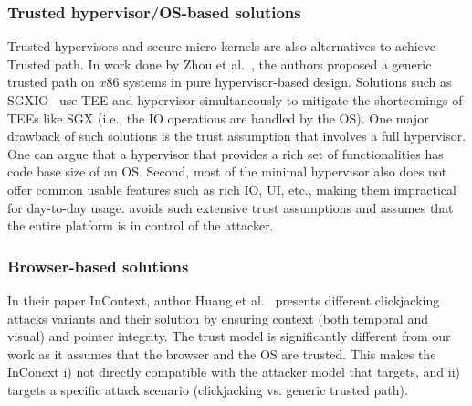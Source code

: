 \subsubsection{Trusted hypervisor/OS-based solutions} Trusted hypervisors and secure micro-kernels are also alternatives to achieve Trusted path. In work done by Zhou et al.~\cite{zhou2012building}, the authors proposed a generic trusted path on $x86$ systems in pure hypervisor-based design. Solutions such as SGXIO~\cite{weiser2017sgxio}  use TEE and hypervisor simultaneously to mitigate the shortcomings of TEEs like SGX (i.e., the IO operations are handled by the OS). One major drawback of such solutions is the trust assumption that involves a full hypervisor. One can argue that a hypervisor that provides a rich set of functionalities has code base size of an OS. Second, most of the minimal hypervisor also does not offer common usable features such as rich IO, UI, etc., making them impractical for day-to-day usage. \name avoids such extensive trust assumptions and assumes that the entire platform is in control of the attacker.


\subsubsection{Browser-based solutions} In their paper InContext, author Huang et al.~\cite{huang2012clickjacking} presents different clickjacking attacks variants and their solution by ensuring context (both temporal and visual) and pointer integrity. The trust model is significantly different from our work as it assumes that the browser and the OS are trusted. This makes the InConext i) not directly compatible with the attacker model that \name targets, and ii) targets a specific attack scenario (clickjacking vs. generic trusted path). 



